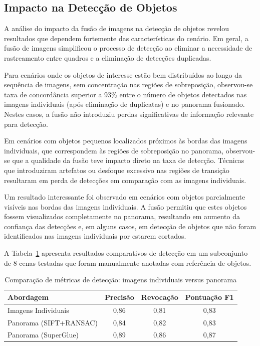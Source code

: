 \subsection{Impacto na Detecção de Objetos}

A análise do impacto da fusão de imagens na detecção de objetos revelou resultados que dependem fortemente das características do cenário. Em geral, a fusão de imagens simplificou o processo de detecção ao eliminar a necessidade de rastreamento entre quadros e a eliminação de detecções duplicadas.

Para cenários onde os objetos de interesse estão bem distribuídos ao longo da sequência de imagens, sem concentração nas regiões de sobreposição, observou-se taxa de concordância superior a 93\% entre o número de objetos detectados nas imagens individuais (após eliminação de duplicatas) e no panorama fusionado. Nestes casos, a fusão não introduziu perdas significativas de informação relevante para detecção.

Em cenários com objetos pequenos localizados próximos às bordas das imagens individuais, que correspondem às regiões de sobreposição no panorama, observou-se que a qualidade da fusão teve impacto direto na taxa de detecção. Técnicas que introduziram artefatos ou desfoque excessivo nas regiões de transição resultaram em perda de detecções em comparação com as imagens individuais.

Um resultado interessante foi observado em cenários com objetos parcialmente visíveis nas bordas das imagens individuais. A fusão permitiu que estes objetos fossem visualizados completamente no panorama, resultando em aumento da confiança das detecções e, em alguns casos, em detecção de objetos que não foram identificados nas imagens individuais por estarem cortados.

A Tabela~\ref{tab:deteccao_comparativa} apresenta resultados comparativos de detecção em um subconjunto de 8 cenas testadas que foram manualmente anotadas com referência de objetos.

\begin{table}[htb]
\centering
\caption{Comparação de métricas de detecção: imagens individuais versus panorama}
\label{tab:deteccao_comparativa}
\begin{tabular}{lccc}
\hline
\textbf{Abordagem} & \textbf{Precisão} & \textbf{Revocação} & \textbf{Pontuação F1} \\
\hline
Imagens Individuais & 0,86 & 0,81 & 0,83 \\
Panorama (SIFT+RANSAC) & 0,84 & 0,82 & 0,83 \\
Panorama (SuperGlue) & 0,89 & 0,86 & 0,87 \\
\hline
\end{tabular}
\end{table}


